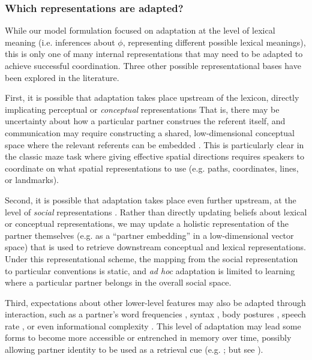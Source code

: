 \subsubsection{Which representations are adapted?}

While our model formulation focused on adaptation at the level of lexical meaning (i.e. inferences about $\phi$, representing different possible lexical meanings), this is only one of many internal representations that may need to be adapted to achieve successful coordination. 
Three other possible representational bases have been explored in the literature. 

First, it is possible that adaptation takes place upstream of the lexicon, directly implicating perceptual or \emph{conceptual} representations \cite{GarrodAnderson87_SayingWhatYouMean,HealeySwobodaUmataKing07_GraphicalLanguageGames}
That is, there may be uncertainty about how a particular partner construes the referent itself, and communication may require constructing a shared, low-dimensional conceptual space where the relevant referents can be embedded \cite{stolk2016conceptual}.
This is particularly clear in the classic maze task \cite{GarrodAnderson87_SayingWhatYouMean} where giving effective spatial directions requires speakers to coordinate on what spatial representations to use (e.g. paths, coordinates, lines, or landmarks). 

Second, it is possible that adaptation takes place even further upstream, at the level of \emph{social} representations \cite{jaech2018low}.
Rather than directly updating beliefs about lexical or conceptual representations, we may update a holistic representation of the partner themselves (e.g. as a ``partner embedding'' in a low-dimensional vector space) that is used to retrieve downstream conceptual and lexical representations. 
Under this representational scheme, the mapping from the social representation to particular conventions is static, and \emph{ad hoc} adaptation is limited to learning where a particular partner belongs in the overall social space.

Third, expectations about other lower-level features may also be adapted through interaction, such as a partner's word frequencies \cite{louwerse2012behavior}, syntax \cite{gruberg2019syntactic,levelt1982surface}, body postures \cite{lakin2003using}, speech rate \cite{giles1991contexts}, or even informational complexity \cite{abney2014complexity}.
This level of adaptation may lead some forms to become more accessible or entrenched in memory over time, possibly allowing partner identity to be used as a retrieval cue (e.g. ; but see ).


